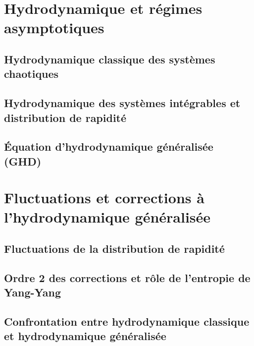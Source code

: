 \chapter{Hydrodynamique et régimes asymptotiques}
\minitoc
\section{Hydrodynamique classique des systèmes chaotiques}
\section{Hydrodynamique des systèmes intégrables et distribution de rapidité}
\section{Équation d’hydrodynamique généralisée (GHD)}

\chapter{Fluctuations et corrections à l’hydrodynamique généralisée}
\minitoc
\section{Fluctuations de la distribution de rapidité}

\section{Ordre 2 des corrections et rôle de l’entropie de Yang-Yang}
\section{Confrontation entre hydrodynamique classique et hydrodynamique généralisée}

			            
